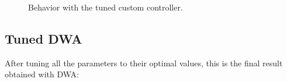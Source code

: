 \documentclass[11pt,a4paper]{article}
\begin{document}
\begin{figure}[H]
{    }
    \quad
    \caption[]{Behavior with the tuned custom controller.}
\end{figure}


\subsection{Tuned DWA}

After tuning all the parameters to their optimal values, this is the final result obtained with DWA:
\end{document}
